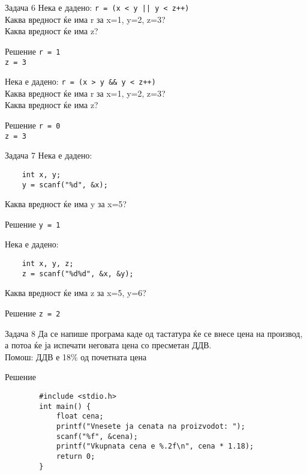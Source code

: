 \begin{frame}[fragile]{Задача 6}
Нека е дадено: \texttt{r = (x < y || y < z++)}\\
	Каква вредност ќе има r за x=1, y=2, z=3?\\
	Каква вредност ќе има z?
	\begin{exampleblock}{Решение}
	\texttt{r = 1\\z = 3}
	\end{exampleblock}
Нека е дадено: \texttt{r = (x > y \&\& y < z++)}\\
	Каква вредност ќе има r за x=1, y=2, z=3?\\
	Каква вредност ќе има z?
	\begin{exampleblock}{Решение}
	\texttt{r = 0\\z = 3}
	\end{exampleblock}
\end{frame}

\begin{frame}[fragile]{Задача 7}
Нека е дадено:
\begin{lstlisting}
	int x, y;
	y = scanf("%d", &x);
\end{lstlisting}
Каква вредност ќе има y за x=5?
	\begin{exampleblock}{Решение}
	\texttt{y = 1}
	\end{exampleblock}
Нека е дадено:
\begin{lstlisting}
	int x, y, z;
	z = scanf("%d%d", &x, &y);
\end{lstlisting}
	Каква вредност ќе има z за x=5, y=6?
	\begin{exampleblock}{Решение}
	\texttt{z = 2}
	\end{exampleblock}
\end{frame}


\begin{frame}[fragile]{Задача 8}
Да се напише програма каде од тастатура ќе се внесе цена на производ, а потоа ќе ја испечати неговата цена со пресметан ДДВ.\\
Помош: ДДВ е 18\% од почетната цена
	\begin{exampleblock}{Решение}
		\begin{lstlisting}
		#include <stdio.h>
		int main() {
		    float cena;
		    printf("Vnesete ja cenata na proizvodot: ");
		    scanf("%f", &cena);
		    printf("Vkupnata cena e %.2f\n", cena * 1.18);
		    return 0;
		}
		\end{lstlisting}
	\end{exampleblock}
\end{frame}


